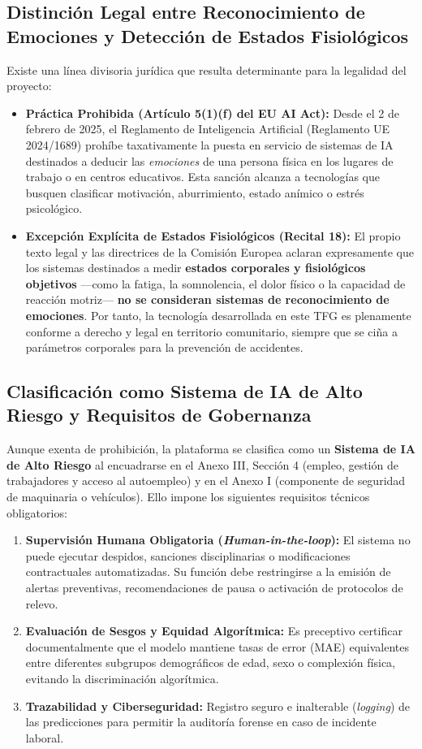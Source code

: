 \subsection{Distinción Legal entre Reconocimiento de Emociones y Detección de Estados Fisiológicos}

Existe una línea divisoria jurídica que resulta determinante para la legalidad del proyecto:
\begin{itemize}
    \item \textbf{Práctica Prohibida (Artículo 5(1)(f) del EU AI Act):} Desde el 2 de febrero de 2025, el Reglamento de Inteligencia Artificial (Reglamento UE 2024/1689) prohíbe taxativamente la puesta en servicio de sistemas de IA destinados a deducir las \textit{emociones} de una persona física en los lugares de trabajo o en centros educativos. Esta sanción alcanza a tecnologías que busquen clasificar motivación, aburrimiento, estado anímico o estrés psicológico.
    \item \textbf{Excepción Explícita de Estados Fisiológicos (Recital 18):} El propio texto legal y las directrices de la Comisión Europea aclaran expresamente que los sistemas destinados a medir \textbf{estados corporales y fisiológicos objetivos} ---como la fatiga, la somnolencia, el dolor físico o la capacidad de reacción motriz--- \textbf{no se consideran sistemas de reconocimiento de emociones}. Por tanto, la tecnología desarrollada en este TFG es plenamente conforme a derecho y legal en territorio comunitario, siempre que se ciña a parámetros corporales para la prevención de accidentes.
\end{itemize}

\subsection{Clasificación como Sistema de IA de Alto Riesgo y Requisitos de Gobernanza}

Aunque exenta de prohibición, la plataforma se clasifica como un \textbf{Sistema de IA de Alto Riesgo} al encuadrarse en el Anexo III, Sección 4 (empleo, gestión de trabajadores y acceso al autoempleo) y en el Anexo I (componente de seguridad de maquinaria o vehículos). Ello impone los siguientes requisitos técnicos obligatorios:
\begin{enumerate}
    \item \textbf{Supervisión Humana Obligatoria (\textit{Human-in-the-loop}):} El sistema no puede ejecutar despidos, sanciones disciplinarias o modificaciones contractuales automatizadas. Su función debe restringirse a la emisión de alertas preventivas, recomendaciones de pausa o activación de protocolos de relevo.
    \item \textbf{Evaluación de Sesgos y Equidad Algorítmica:} Es preceptivo certificar documentalmente que el modelo mantiene tasas de error (MAE) equivalentes entre diferentes subgrupos demográficos de edad, sexo o complexión física, evitando la discriminación algorítmica.
    \item \textbf{Trazabilidad y Ciberseguridad:} Registro seguro e inalterable (\textit{logging}) de las predicciones para permitir la auditoría forense en caso de incidente laboral.
\end{enumerate}

